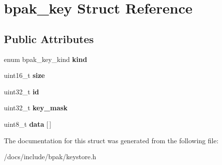 \hypertarget{structbpak__key}{}\section{bpak\+\_\+key Struct Reference}
\label{structbpak__key}
\subsection*{Public Attributes}
\begin{DoxyCompactItemize}
\item 
\mbox{\label{structbpak__key_abdfcab0785f1a040445f63f8cc68deed}} 
enum bpak\+\_\+key\+\_\+kind {\bfseries kind}
\item 
\mbox{\label{structbpak__key_ad523d503dfa49bb185d3e8b92dc90f69}} 
uint16\+\_\+t {\bfseries size}
\item 
\mbox{\label{structbpak__key_abf25fc059131c53389dea7604265bac7}} 
uint32\+\_\+t {\bfseries id}
\item 
\mbox{\label{structbpak__key_ac69bc0563d2d7671389d544976f1ae9a}} 
uint32\+\_\+t {\bfseries key\+\_\+mask}
\item 
\mbox{\label{structbpak__key_a85a3fdaa32fac738eca9b168f739948f}} 
uint8\+\_\+t {\bfseries data} \mbox{[}$\,$\mbox{]}
\end{DoxyCompactItemize}


The documentation for this struct was generated from the following file\+:\begin{DoxyCompactItemize}
\item 
/docs/include/bpak/keystore.\+h\end{DoxyCompactItemize}
